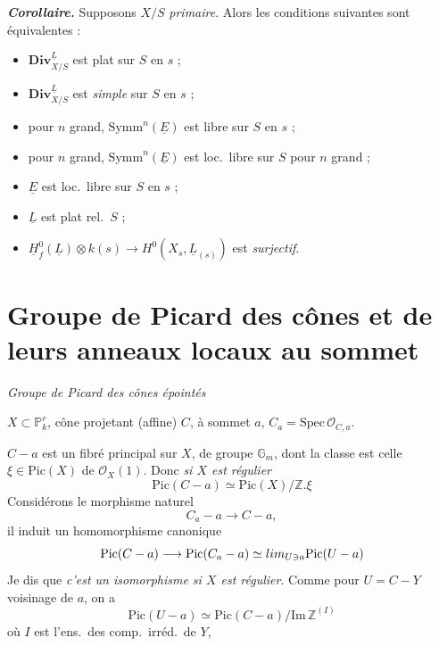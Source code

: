 \documentclass[11pt,a4paper]{article}
\begin{document}
\textbf{\emph{Corollaire.}} Supposons $X/S$ \emph{primaire}. Alors
 les conditions suivantes sont
équivalentes :
\begin{itemize}
  \item[(i)] $\mathbf{Div}^{\underline{L}}_{X/S}$ est plat sur $S$ en $s$ ;
  \item[(ii)] $\mathbf{Div}^{\underline{L}}_{X/S}$ est \emph{simple} sur $S$ en $s$ ;
  \item[(iii)] pour $n$ grand, $\mathrm{Symm}^n(\underline{E})$ est libre sur $S$ en $s$ ;
  \item[(iv)] pour  $n$ grand,
    $\mathrm{Symm}^{n}(\underline{E})$ est loc.\ libre sur $S$  pour
    $n$ grand ;
  \item[(v)] $\underline{E}$ est  loc.\ libre sur $S$ en $s$ ;
  \item[(vi)] $\underline{L}$ est  plat rel.\ $S$ ;
  \item[(vii)] $\underline{H}^0_f(\underline{L}) \otimes k(s) \to H^0(X_s, \underline{L}_{(s)})$
    est \emph{surjectif}.
\end{itemize}

\section{Groupe de Picard des cônes et de leurs anneaux locaux au sommet}

\emph{Groupe de Picard des cônes épointés}

$X \subset \mathbb{P}^r_k$, cône projetant (affine) $C$, à 
sommet $a$, $C_a = \mathrm{Spec}\, \mathcal{O}_{C,a}$.

$C - a$ est un fibré principal sur $X$, de groupe $\mathbb{G}_m$, dont la classe
est celle $\xi \in \mathrm{Pic}(X)$ de $\mathcal{O}_X(1)$. Donc \emph{si $X$ est
régulier}
\[
  \mathrm{Pic}(C - a) \simeq \mathrm{Pic}(X)/\mathbb{Z}.\xi
\]
Considérons le morphisme naturel
\[
  C_a - a \longrightarrow C - a ,
\]
il induit un homomorphisme canonique
\[
  \mathrm{Pic}(C - a) \longrightarrow \mathrm{Pic}(C_a - a)
  \simeq \varinjlim_{U \ni a} \mathrm{Pic}(U - a)
\]
Je dis que \emph{c'est un isomorphisme si $X$ est régulier}. Comme pour
$U = C - Y$ voisinage de $a$, on a
\[
  \mathrm{Pic}(U - a) \simeq \mathrm{Pic}(C - a)/\mathrm{Im}\, \mathbb{Z}^{(I)}
\]
où $I$ est l'ens.\ des comp.\ irréd.\ de $Y$,
\end{document}
